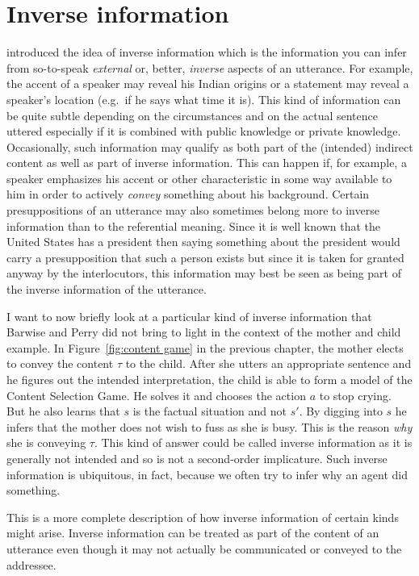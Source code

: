 \section{Inverse information}
\citet{bp:sa} introduced the idea of inverse information which is the information you can infer from so-to-speak \emph{external} or, better, \emph{inverse} aspects of an utterance. For example, the accent of a speaker may reveal his Indian origins or a statement may reveal a speaker's location (e.g.\ if he says what time it is). This kind of information can be quite subtle depending on the circumstances and on the actual sentence uttered especially if it is combined with public knowledge or private knowledge. Occasionally, such information may qualify as both part of the (intended) indirect content as well as part of inverse information. This can happen if, for example, a speaker emphasizes his accent or other characteristic in some way available to him in order to actively \emph{convey} something about his background. Certain presuppositions of an utterance may also sometimes belong more to inverse information than to the referential meaning. Since it is well known that the United States has a president then saying something about the president would carry a presupposition that such a person exists but since it is taken for granted anyway by the interlocutors, this information may best be seen as being part of the inverse information of the utterance.

I want to now briefly look at a particular kind of inverse information that Barwise and Perry did not bring to light in the context of the mother and child example. In Figure~\ref{fig:content game} in the previous chapter, the mother elects to convey the content $\tau$ to the child. After she utters an appropriate sentence and he figures out the intended interpretation, the child is able to form a model of the Content Selection Game. He solves it and chooses the action $a$ to stop crying. But he also learns that $s$ is the factual situation and not $s'$. By digging into $s$ he infers that the mother does not wish to fuss as she is busy. This is the reason \emph{why} she is conveying $\tau$. This kind of answer could be called inverse information as it is generally not intended and so is not a second-order implicature. Such inverse information is ubiquitous, in fact, because we often try to infer why an agent did something.

This is a more complete description of how inverse information of certain kinds might arise. Inverse information can be treated as part of the content of an utterance even though it may not actually be communicated or conveyed to the addressee.


